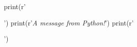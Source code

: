 \documentclass{article}
\begin{document}
\begin{pycode}
    print(r'\begin{center}')
    print(r'\textit{A message from Python!}')
    print(r'\end{center}')
\end{pycode}
\end{document}
